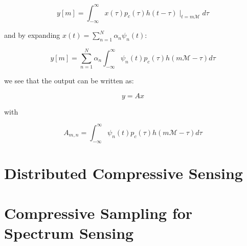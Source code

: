 \begin{equation}
y\left[m\right] = \int_{-\infty}^{\infty} x\left(\tau\right)p_c\left(\tau\right)h\left(t - \tau\right)\mid_{t = m\mathcal{M}}d\tau
\end{equation}

and by expanding \(x\left(t\right) = \sum_{n=1}^N \alpha_n \psi_n\left(t\right)\):

\begin{equation}
y\left[m\right] =  \sum_{n=1}^N \alpha_n \int_{-\infty}^{\infty} \psi_n\left(t\right)p_c\left(\tau\right)h\left(m\mathcal{M} - \tau\right)d\tau
\end{equation}

we see that the output can be written as:

\begin{equation}
y = Ax
\end{equation}

with

\begin{equation}
A_{m,n} = \int_{-\infty}^{\infty} \psi_n\left(t\right)p_c\left(\tau\right)h\left(m\mathcal{M} - \tau\right)d\tau
\end{equation}

\section{Distributed Compressive Sensing}

\section{Compressive Sampling for Spectrum Sensing}